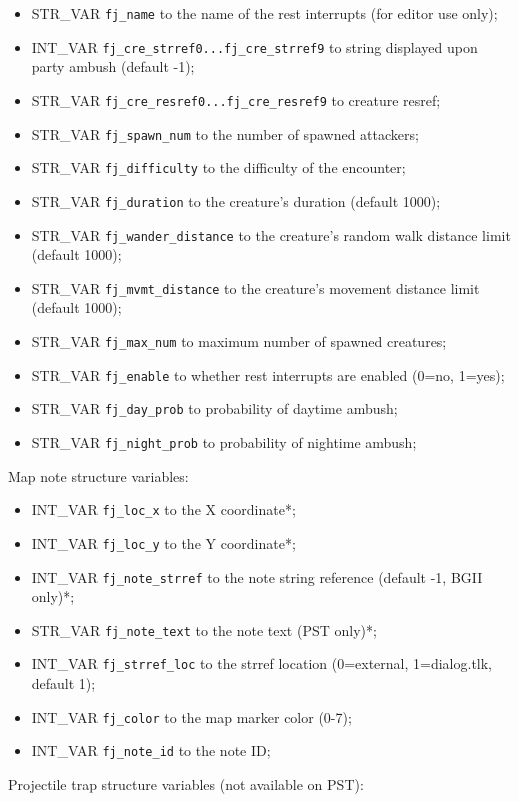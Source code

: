 \documentclass{article}
\begin{document}
\begin{itemize}
\item STR_VAR \verb+fj_name+ to the name of the rest interrupts (for editor use only);
\item INT_VAR \verb+fj_cre_strref0...fj_cre_strref9+ to string displayed upon party ambush (default -1);
\item STR_VAR \verb+fj_cre_resref0...fj_cre_resref9+ to creature resref;
\item STR_VAR \verb+fj_spawn_num+ to the number of spawned attackers;
\item STR_VAR \verb+fj_difficulty+ to the difficulty of the encounter;
\item STR_VAR \verb+fj_duration+ to the creature's duration (default 1000);
\item STR_VAR \verb+fj_wander_distance+ to the creature's random walk distance limit (default 1000);
\item STR_VAR \verb+fj_mvmt_distance+ to the creature's movement distance limit (default 1000);
\item STR_VAR \verb+fj_max_num+ to maximum number of spawned creatures;
\item STR_VAR \verb+fj_enable+ to whether rest interrupts are enabled (0=no, 1=yes);
\item STR_VAR \verb+fj_day_prob+ to probability of daytime ambush;
\item STR_VAR \verb+fj_night_prob+ to probability of nightime ambush;
\end{itemize}
Map note structure variables:
\begin{itemize}
\item INT_VAR \verb+fj_loc_x+ to the X coordinate*;
\item INT_VAR \verb+fj_loc_y+ to the Y coordinate*;
\item INT_VAR \verb+fj_note_strref+ to the note string reference (default -1, BGII only)*;
\item STR_VAR \verb+fj_note_text+ to the note text (PST only)*;
\item INT_VAR \verb+fj_strref_loc+ to the strref location (0=external, 1=dialog.tlk, default 1);
\item INT_VAR \verb+fj_color+ to the map marker color (0-7);
\item INT_VAR \verb+fj_note_id+ to the note ID;
\end{itemize}
Projectile trap structure variables (not available on PST):
\end{document}
